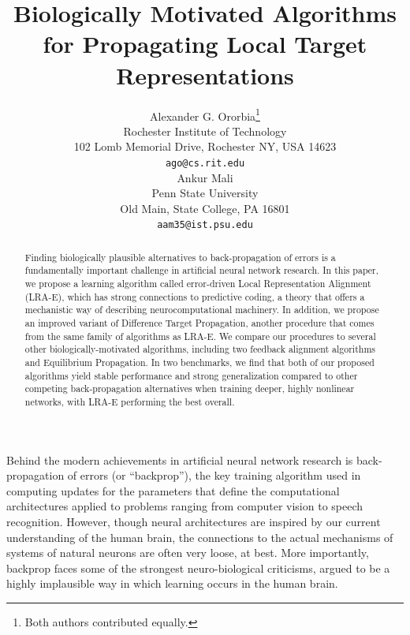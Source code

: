 \documentclass[letterpaper]{article} %
\begin{document}
%
\title{Biologically Motivated Algorithms for Propagating Local Target Representations}
\author{Alexander G. Ororbia\thanks{ \hspace{0.1cm} Both authors contributed equally.}\\
Rochester Institute of Technology\\
102 Lomb Memorial Drive, Rochester NY, USA 14623\\
{\tt ago@cs.rit.edu}\\
\And
Ankur Mali\footnotemark[1] \\
Penn State University\\
Old Main, State College, PA 16801\\
{\tt aam35@ist.psu.edu}
}
\maketitle
\begin{abstract}
Finding biologically plausible alternatives to back-propagation of errors is a fundamentally important challenge in artificial neural network research. In this paper, we propose a learning algorithm called error-driven Local Representation Alignment (LRA-E), which has strong connections to predictive coding, a theory that offers a mechanistic way of describing neurocomputational machinery. In addition, we propose an improved variant of Difference Target Propagation, another procedure that comes from the same family of algorithms as LRA-E. We compare our procedures to several other biologically-motivated algorithms, including two feedback alignment algorithms and Equilibrium Propagation. In two benchmarks, we find that both of our proposed algorithms yield stable performance and strong generalization compared to other competing back-propagation alternatives when training deeper, highly nonlinear networks, with LRA-E performing the best overall.
\end{abstract}

\noindent Behind the modern achievements in artificial neural network research is back-propagation of errors \cite{rumelhart1988backprop} (or ``backprop''), the key training algorithm used in computing updates for the parameters that define the computational architectures applied to problems ranging from computer vision to speech recognition. However, though neural architectures are inspired by our current understanding of the human brain, the connections to the actual mechanisms of systems of natural neurons are often very loose, at best. More importantly, backprop faces some of the strongest neuro-biological criticisms, argued to be a highly implausible way in which learning occurs in the human brain.
\end{document}

